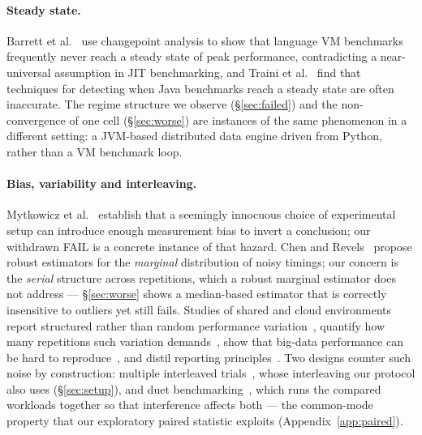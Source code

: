 \documentclass[sigconf,review,anonymous]{acmart}
\begin{document}
\paragraph{Steady state.} Barrett et al.~\cite{barrett2017warmup} use changepoint analysis to show
that language VM benchmarks frequently never reach a steady state of peak performance,
contradicting a near-universal assumption in JIT benchmarking, and Traini et
al.~\cite{traini2023towards} find that techniques for detecting when Java benchmarks reach a
steady state are often inaccurate. The regime structure we observe (\S\ref{sec:failed}) and the
non-convergence of one cell (\S\ref{sec:worse}) are instances of the same phenomenon in a
different setting: a JVM-based distributed data engine driven from Python, rather than a VM
benchmark loop.

\paragraph{Bias, variability and interleaving.} Mytkowicz et al.~\cite{mytkowicz2009wrong}
establish that a seemingly innocuous choice of experimental setup can introduce enough measurement
bias to invert a conclusion; our withdrawn FAIL is a concrete instance of that hazard. Chen and
Revels~\cite{chen2016robust} propose robust estimators for the \emph{marginal} distribution of noisy
timings; our concern is the \emph{serial} structure across repetitions, which a robust marginal
estimator does not address --- \S\ref{sec:worse} shows a median-based estimator that is correctly
insensitive to outliers yet still fails. Studies of shared and cloud environments report
structured rather than random performance variation~\cite{leitner2016patterns}, quantify how many
repetitions such variation demands~\cite{laaber2019software,maricq2018taming}, show that big-data
performance can be hard to reproduce~\cite{uta2020big}, and distil reporting
principles~\cite{papadopoulos2021methodological}. Two designs counter such noise by construction:
multiple interleaved trials~\cite{abedi2017conducting}, whose interleaving our protocol also uses
(\S\ref{sec:setup}), and duet benchmarking~\cite{bulej2020duet}, which runs the compared workloads
together so that interference affects both --- the common-mode property that our exploratory paired
statistic exploits (Appendix~\ref{app:paired}).
\end{document}
